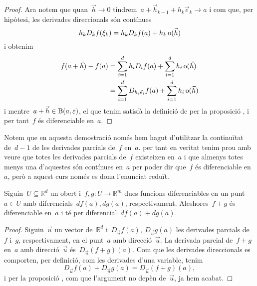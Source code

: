 \documentclass[../../main.tex]{subfiles}
\begin{document}
\begin{theorem}
\begin{proof}
            Ara notem que quan~\(\vec{h}\to0\) tindrem~\(a+\vec{h}_{k-1}+h_{k}\vec{e}_{k}\to a\) i com que, per hipòtesi, les derivades direccionals són contínues
            \[
                h_{k}D_{k}f(\xi_{k})=h_{k}D_{k}f(a)+h_{k}\operatorname{o}(\vec{h})
            \]
            i obtenim
            \begin{align*}
            f(a+\vec{h})-f(a)&=\sum_{i=1}^{d}h_{i}D_{i}f(a)+\sum_{i=1}^{d}h_{i}\operatorname{o}(\vec{h})\\
            &=\sum_{i=1}^{d}D_{h_{i}\vec{e}_{i}}f(a)+\sum_{i=1}^{d}h_{i}\operatorname{o}(\vec{h})
            \end{align*}
            i mentre~\(a+\vec{h}\in\operatorname{B}(a,\varepsilon)\), el que tenim satisfà la definició de  per la proposició , i per tant~\(f\) és diferenciable en~\(a\).
        \end{proof}
    \end{theorem}
    \begin{note}
        Notem que en aquesta demostració només hem hagut d'utilitzar la continuïtat de~\(d-1\) de les derivades parcials de~\(f\) en~\(a\).
        per tant en veritat tenim prou amb veure que totes les derivades parcials de~\(f\) existeixen en~\(a\) i que almenys totes menys una d'aquestes són contínues en~\(a\) per poder dir que~\(f\) és diferenciable en~\(a\), però a aquest curs només es dona l'enunciat reduït.
    \end{note}
    \begin{proposition}
        Siguin~\(U\subseteq\mathbb{R}^{d}\) un obert i~\(f,g\colon U\to\mathbb{R}^{m}\) dues funcions diferenciables en un punt~\(a\in U\) amb diferencials~\(df(a),dg(a)\), respectivament.
        Aleshores~\(f+g\) és diferenciable en~\(a\) i té per diferencial~\(df(a)+dg(a)\).
        \begin{proof}
            Siguin~\(\vec{u}\) un vector de~\(\mathbb{R}^{d}\) i~\(D_{\vec{u}}f(a),\ D_{\vec{u}}g(a)\) les derivades parcials de~\(f\) i~\(g\), respectivament, en el punt~\(a\) amb direcció~\(\vec{u}\).
            La derivada parcial de~\(f+g\) en~\(a\) amb direcció~\(\vec{u}\) és~\(D_{\vec{u}}(f+g)(a)\).
            Com que les derivades direccionals es comporten, per definició, com les derivades d'una variable, tenim
            \[
                D_{\vec{u}}f(a)+D_{\vec{u}}g(a)=D_{\vec{u}}(f+g)(a),
            \]
            i per la proposició , com que l'argument no depèn de~\(\vec{u}\), ja hem acabat.
        \end{proof}
    \end{proposition}
\end{document}

